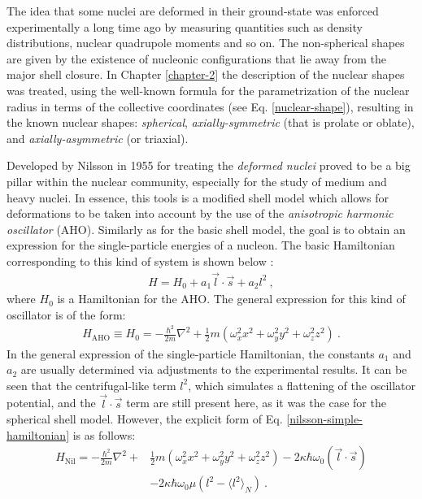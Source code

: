 The idea that some nuclei are deformed in their ground-state was enforced experimentally a long time ago by measuring quantities such as density distributions, nuclear quadrupole moments \cite{casten2000nuclear} and so on. The non-spherical shapes are given by the existence of nucleonic configurations that lie away from the major shell closure. In Chapter \ref{chapter-2} the description of the nuclear shapes was treated, using the well-known formula for the parametrization of the nuclear radius in terms of the collective coordinates (see Eq. \ref{nuclear-shape}), resulting in the known nuclear shapes: \emph{spherical}, \emph{axially-symmetric} (that is prolate or oblate), and \emph{axially-asymmetric} (or triaxial). 

Developed by Nilsson in 1955 \cite{nilsson1955binding} for treating the \emph{deformed nuclei} proved to be a big pillar within the nuclear community, especially for the study of medium and heavy nuclei. In essence, this tools is a modified shell model which allows for deformations to be taken into account by the use of the \emph{anisotropic harmonic oscillator} (AHO). Similarly as for the basic shell model, the goal is to obtain an expression for the single-particle energies of a nucleon. The basic Hamiltonian corresponding to this kind of system is shown below \cite{bertulani2007nuclear}:
\begin{align}
    H=H_0+a_1\vec{l}\cdot\vec{s}+a_2l^2\ ,
    \label{nilsson-simple-hamiltonian}
\end{align}
where $H_0$ is a Hamiltonian for the AHO. The general expression for this kind of oscillator is of the form:
\begin{align}
    H_\text{AHO}\equiv H_0=-\frac{\hbar^2}{2m}\nabla^2+\frac{1}{2}m(\omega_x^2x^2+\omega_y^2y^2+\omega_z^2z^2)\ .
\end{align}
In the general expression of the single-particle Hamiltonian, the constants $a_1$ and $a_2$ are usually determined via adjustments to the experimental results. It can be seen that the centrifugal-like term $l^2$, which simulates a flattening of the oscillator potential, and the $\vec{l}\cdot\vec{s}$ term are still present here, as it was the case for the spherical shell model. However, the explicit form of Eq. \ref{nilsson-simple-hamiltonian} is as follows:
\begin{align}
    H_\text{Nil}=-\frac{\hbar^2}{2m}\nabla^2+&\frac{1}{2}m(\omega_x^2x^2+\omega_y^2y^2+\omega_z^2z^2)-2\kappa\hbar\omega_0(\vec{l}\cdot\vec{s})\nonumber\\&-2\kappa\hbar\omega_0\mu\left(l^2-\langle l^2\rangle_N\right)\ .
    \label{eq-full-nilsson-ham}
\end{align}
